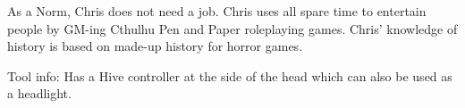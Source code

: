 \begin{npcBox}[title=Norm: Chris]
    \begin{stressSection}
    \end{stressSection}
    \begin{tabularx}{\textwidth}{ XX }
    \end{tabularx}

    \begin{consequences}
    \item {}
    \item {}
    \item {}
    \end{consequences}

    \begin{npcDescription}

        As a Norm, Chris does not need a job. Chris uses all spare time to entertain people by GM-ing Cthulhu Pen and Paper roleplaying games. Chris' knowledge of history is based on made-up history for horror games.

    Tool info: Has a Hive controller at the side of the head which can also be used as a headlight.

    \end{npcDescription}

\end{npcBox}

\newpage

